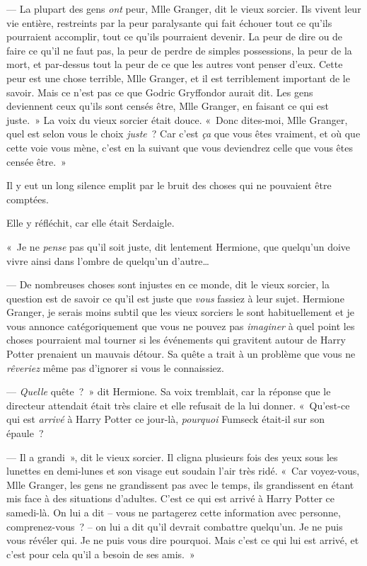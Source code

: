 --- La plupart des gens \emph{ont} peur, Mlle Granger, dit le vieux sorcier.
Ils vivent leur vie entière, restreints par la peur paralysante qui fait échouer tout ce qu'ils pourraient accomplir, tout ce qu'ils pourraient devenir.
La peur de dire ou de faire ce qu'il ne faut pas, la peur de perdre de simples possessions, la peur de la mort, et par-dessus tout la peur de ce que les autres vont penser d'eux.
Cette peur est une chose terrible, Mlle Granger, et il est terriblement important de le savoir.
Mais ce n'est pas ce que Godric Gryffondor aurait dit.
Les gens deviennent ceux qu'ils sont censés être, Mlle Granger, en faisant ce qui est juste.~»
La voix du vieux sorcier était douce.
«~Donc dites-moi, Mlle Granger, quel est selon vous le choix \emph{juste}~?
Car c'est \emph{ça} que vous êtes vraiment, et où que cette voie vous mène, c'est en la suivant que vous deviendrez celle que vous êtes censée être.~»

Il y eut un long silence emplit par le bruit des choses qui ne pouvaient être comptées.

Elle y réfléchit, car elle était Serdaigle.

«~Je ne \emph{pense} pas qu'il soit juste, dit lentement Hermione, que quelqu'un doive vivre ainsi dans l'ombre de quelqu'un d'autre…

--- De nombreuses choses sont injustes en ce monde, dit le vieux sorcier, la question est de savoir ce qu'il est juste que \emph{vous} fassiez à leur sujet.
Hermione Granger, je serais moins subtil que les vieux sorciers le sont habituellement et je vous annonce catégoriquement que vous ne pouvez pas \emph{imaginer} à quel point les choses pourraient mal tourner si les événements qui gravitent autour de Harry Potter prenaient un mauvais détour.
Sa quête a trait à un problème que vous ne \emph{rêveriez} même pas d'ignorer si vous le connaissiez.

--- \emph{Quelle} quête~?~»
dit Hermione.
Sa voix tremblait, car la réponse que le directeur attendait était très claire et elle refusait de la lui donner.
«~Qu'est-ce qui est \emph{arrivé} à Harry Potter ce jour-là, \emph{pourquoi} Fumseck était-il sur son épaule~?

--- Il a grandi~», dit le vieux sorcier.
Il cligna plusieurs fois des yeux sous les lunettes en demi-lunes et son visage eut soudain l'air très ridé.
«~Car voyez-vous, Mlle Granger, les gens ne grandissent pas avec le temps, ils grandissent en étant mis face à des situations d'adultes.
C'est ce qui est arrivé à Harry Potter ce samedi-là.
On lui a dit -- vous ne partagerez cette information avec personne, comprenez-vous~?
-- on lui a dit qu'il devrait combattre quelqu'un.
Je ne puis vous révéler qui.
Je ne puis vous dire pourquoi.
Mais c'est ce qui lui est arrivé, et c'est pour cela qu'il a besoin de ses amis.~»

